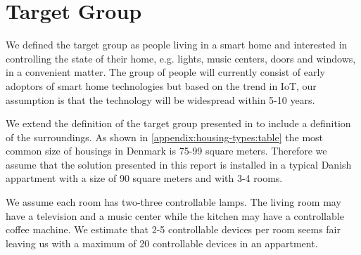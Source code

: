 \section{Target Group}
\label{sec:target-group}

We defined the target group as people living in a smart home and interested in controlling the state of their home, e.g. lights, music centers, doors and windows, in a convenient matter. The group of people will currently consist of early adoptors of smart home technologies but based on the trend in IoT, our assumption is that the technology will be widespread within 5-10 years\cite[p. 15]{prespecialisation}. 

We extend the definition of the target group presented in \cite[p. 15]{prespecialization} to include a definition of the surroundings. As shown in \cref{appendix:housing-types:table} the most common size of housings in Denmark is 75-99 square meters. Therefore we assume that the solution presented in this report is installed in a typical Danish appartment with a size of 90 square meters and with 3-4 rooms. 

We assume each room has two-three controllable lamps. The living room may have a television and a music center while the kitchen may have a controllable coffee machine. We estimate that 2-5 controllable devices per room seems fair leaving us with a maximum of 20 controllable devices in an appartment.

